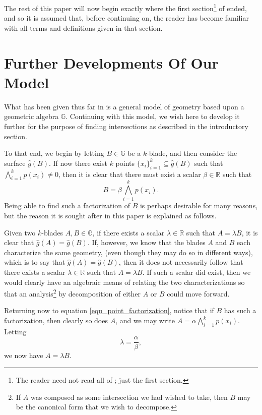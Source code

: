 \documentclass{birkjour}
\theoremstyle{definition}
\theoremstyle{remark}
\numberwithin{equation}{section}
\newcommand{\R}{\mathbb{R}}
\newcommand{\G}{\mathbb{G}}
\newcommand{\gh}{\hat{g}}
\begin{document}
The rest of this paper will now begin exactly where the first section\footnote{The reader
need not read all of \cite{}; just the first section.} of \cite{} ended, and
so it is assumed that, before continuing on, the reader has become familiar with
all terms and definitions given in that section.

\section{Further Developments Of Our Model}

What has been given thus far in \cite{} is a general model of geometry based upon
a geometric algebra $\G$.  Continuing with this model, we wish here to develop it
further for the purpose of finding intersections as described in the introductory section.

To that end, we begin by letting $B\in\G$ be a $k$-blade, and then consider the surface $\gh(B)$.
If now there exist $k$ points $\{x_i\}_{i=1}^k\subseteq\gh(B)$ such that $\bigwedge_{i=1}^k p(x_i)\neq 0$,
then it is clear that there must exist a scalar $\beta\in\R$ such that
\begin{equation}\label{equ_point_factorization}
B = \beta\bigwedge_{i=1}^k p(x_i).
\end{equation}
Being able to find such a factorization of $B$ is perhaps desirable for many reasons, but the
reason it is sought after in this paper is explained as follows.

Given two $k$-blades $A,B\in\G$, if there exists a scalar $\lambda\in\R$
such that $A=\lambda B$, it is clear that $\gh(A)=\gh(B)$.  If, however, we know that
the blades $A$ and $B$ each characterize the same geometry, (even though they may do so in different ways),
which is to say that $\gh(A)=\gh(B)$, then it does not necessarily follow that there exists a
scalar $\lambda\in\R$ such that $A=\lambda B$.  If such a scalar did exist, then
we would clearly have an algebraic means of relating the two characterizations so that
an analysis\footnote{If $A$ was composed as some intersection we had wished to take,
then $B$ may be the canonical form
that we wish to decompose.} by decomposition of either $A$ or $B$ could move forward.

Returning now to equation \eqref{equ_point_factorization}, notice that if $B$ has
such a factorization, then clearly so does $A$, and we may write $A=\alpha\bigwedge_{i=1}^k p(x_i)$.
Letting
\begin{equation*}
\lambda=\frac{\alpha}{\beta},
\end{equation*}
we now have $A=\lambda B$.
\end{document}
